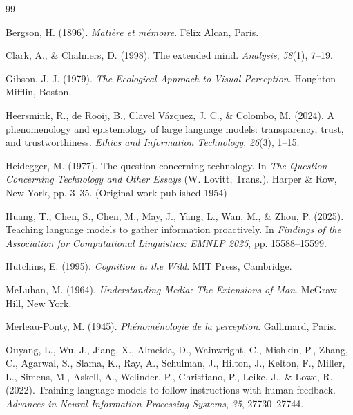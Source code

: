 \documentclass[12pt]{article}
\begin{document}

\begin{thebibliography}{99}

Bergson, H. (1896). \textit{Mati\`{e}re et m\'{e}moire}. F\'{e}lix Alcan, Paris.

Clark, A., \& Chalmers, D. (1998). The extended mind. \textit{Analysis}, \textit{58}(1), 7--19.

Gibson, J. J. (1979). \textit{The Ecological Approach to Visual Perception}. Houghton Mifflin, Boston.

Heersmink, R., de Rooij, B., Clavel V\'{a}zquez, J. C., \& Colombo, M. (2024). A phenomenology and epistemology of large language models: transparency, trust, and trustworthiness. \textit{Ethics and Information Technology}, \textit{26}(3), 1--15.

Heidegger, M. (1977). The question concerning technology. In \textit{The Question Concerning Technology and Other Essays} (W. Lovitt, Trans.). Harper \& Row, New York, pp. 3--35. (Original work published 1954)

Huang, T., Chen, S., Chen, M., May, J., Yang, L., Wan, M., \& Zhou, P. (2025). Teaching language models to gather information proactively. In \textit{Findings of the Association for Computational Linguistics: EMNLP 2025}, pp. 15588--15599.

Hutchins, E. (1995). \textit{Cognition in the Wild}. MIT Press, Cambridge.

McLuhan, M. (1964). \textit{Understanding Media: The Extensions of Man}. McGraw-Hill, New York.

Merleau-Ponty, M. (1945). \textit{Ph\'{e}nom\'{e}nologie de la perception}. Gallimard, Paris.

Ouyang, L., Wu, J., Jiang, X., Almeida, D., Wainwright, C., Mishkin, P., Zhang, C., Agarwal, S., Slama, K., Ray, A., Schulman, J., Hilton, J., Kelton, F., Miller, L., Simens, M., Askell, A., Welinder, P., Christiano, P., Leike, J., \& Lowe, R. (2022). Training language models to follow instructions with human feedback. \textit{Advances in Neural Information Processing Systems}, \textit{35}, 27730--27744.


\end{thebibliography}
\end{document}
